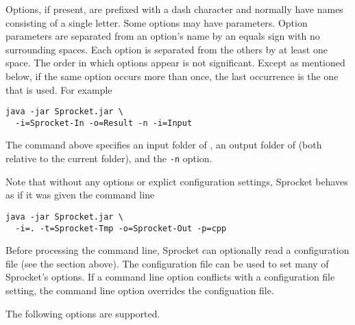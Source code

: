 Options, if present, are prefixed with a dash character and normally have names consisting of a
single letter. Some options may have parameters. Option parameters are separated from an
option's name by an equals sign with no surrounding spaces. Each option is separated from the
others by at least one space. The order in which options appear is not significant. Except as
mentioned below, if the same option occurs more than once, the last occurrence is the one that
is used. For example
\begin{verbatim}
java -jar Sprocket.jar \
  -i=Sprocket-In -o=Result -n -i=Input
\end{verbatim}
The command above specifies an input folder of , an output folder of
\filename{Result} (both relative to the current folder), and the \texttt{-n} option.

Note that without any options or explict configuration settings, Sprocket behaves as if it was
given the command line
\begin{verbatim}
java -jar Sprocket.jar \
  -i=. -t=Sprocket-Tmp -o=Sprocket-Out -p=cpp
\end{verbatim}

Before processing the command line, Sprocket can optionally read a configuration file (see the
section above). The configuration file can be used to set many of Sprocket's options. If a
command line option conflicts with a configuration file setting, the command line option
overrides the configuation file.

The following options are supported.

